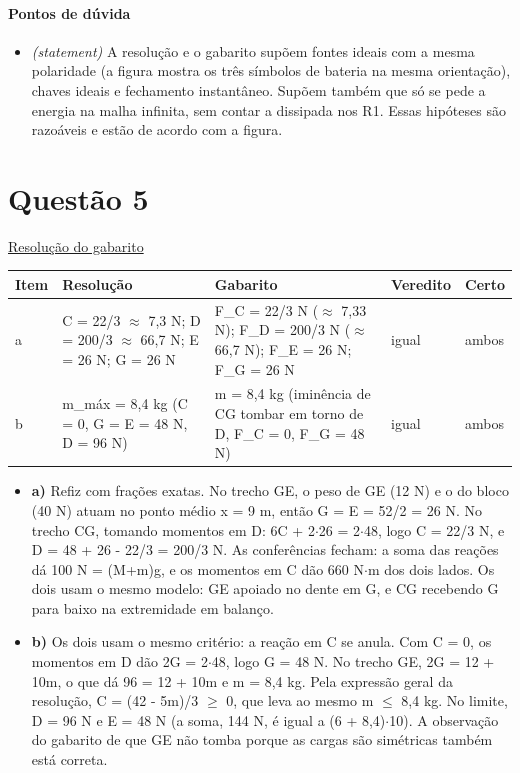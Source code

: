 \documentclass{article}%
\begin{document}
\paragraph{Pontos de dúvida}%
\begin{itemize}%
\item%
\textit{(statement)} A resolução e o gabarito supõem fontes ideais com a mesma polaridade (a figura mostra os três símbolos de bateria na mesma orientação), chaves ideais e fechamento instantâneo. Supõem também que só se pede a energia na malha infinita, sem contar a dissipada nos R1. Essas hipóteses são razoáveis e estão de acordo com a figura.%
\end{itemize}%
\section*{Questão 5}%
\href{https://poliedroresolve.sistemapoliedro.com.br/vestibulares/ime/2026/ime-2-fase-dia-2-24-10-2025-2-fase-dia-2/dissertativa-5-fisica-2-fase-dia-2-ime-2026}{Resolução do gabarito}\par\smallskip%
\begin{longtable}{@{}p{} p{} p{} p{} p{}@{}}\toprule Item & Resolução & Gabarito & Veredito & Certo \\ \midrule
a & C = 22/3 $\approx$ 7,3 N; D = 200/3 $\approx$ 66,7 N; E = 26 N; G = 26 N & F\_C = 22/3 N ($\approx$ 7,33 N); F\_D = 200/3 N ($\approx$ 66,7 N); F\_E = 26 N; F\_G = 26 N & igual & ambos \\
b & m\_máx = 8,4 kg (C = 0, G = E = 48 N, D = 96 N) & m = 8,4 kg (iminência de CG tombar em torno de D, F\_C = 0, F\_G = 48 N) & igual & ambos \\
\bottomrule\end{longtable}%
\begin{itemize}%
\item%
\textbf{a)} Refiz com frações exatas. No trecho GE, o peso de GE (12 N) e o do bloco (40 N) atuam no ponto médio x = 9 m, então G = E = 52/2 = 26 N. No trecho CG, tomando momentos em D: 6C + 2$\cdot$26 = 2$\cdot$48, logo C = 22/3 N, e D = 48 + 26 - 22/3 = 200/3 N. As conferências fecham: a soma das reações dá 100 N = (M+m)g, e os momentos em C dão 660 N$\cdot$m dos dois lados. Os dois usam o mesmo modelo: GE apoiado no dente em G, e CG recebendo G para baixo na extremidade em balanço.%
\item%
\textbf{b)} Os dois usam o mesmo critério: a reação em C se anula. Com C = 0, os momentos em D dão 2G = 2$\cdot$48, logo G = 48 N. No trecho GE, 2G = 12 + 10m, o que dá 96 = 12 + 10m e m = 8,4 kg. Pela expressão geral da resolução, C = (42 - 5m)/3 $\geq$ 0, que leva ao mesmo m $\leq$ 8,4 kg. No limite, D = 96 N e E = 48 N (a soma, 144 N, é igual a (6 + 8,4)$\cdot$10). A observação do gabarito de que GE não tomba porque as cargas são simétricas também está correta.%
\end{itemize}%
\end{document}
